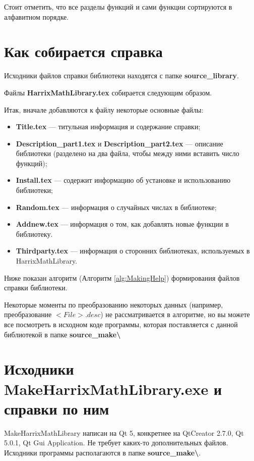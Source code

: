 \documentclass[a4paper,12pt]{article}
\begin{document}
Стоит отметить, что все разделы функций и сами функции сортируются в алфавитном порядке.


\section{Как собирается справка}
Исходники файлов справки библиотеки находятся с папке
\textbf{source\_library}.

Файлы \textbf{HarrixMathLibrary.tex} собирается следующим образом.

Итак, вначале добавляются к файлу некоторые основные файлы:

\begin{itemize}
\item \textbf{Title.tex} --- титульная информация и содержание справки;
\item \textbf{Description\_part1.tex} и \textbf{Description\_part2.tex} --- описание библиотеки (разделено на два файла, чтобы между ними вставить число функций);
\item \textbf{Install.tex} --- содержит информацию об установке и использованию библиотеки;
\item \textbf{Random.tex} --- информация о случайных числах в библиотеке;
\item \textbf{Addnew.tex} --- информация о том, как добавлять новые функции в библиотеку.
\item \textbf{Thirdparty.tex} --- информация о сторонних библиотеках, используемых в HarrixMathLibrary.
\end{itemize}

Ниже показан алгоритм (Алгоритм \ref{alg:MakingHelp}) формирования файлов справки библиотеки.

Некоторые моменты по преобразованию некоторых данных (например, преобразование $<File>.desc$) не рассматривается в алгоритме, но вы можете все посмотреть в исходном коде программы, которая поставляется с данной библиотекой в папке \textbf{source\_make\textbackslash}

\section{Исходники MakeHarrixMathLibrary.exe и справки по ним}

MakeHarrixMathLibrary написан на Qt 5, конкретнее на QtCreator 2.7.0, Qt 5.0.1, Qt Gui Application.  Не требует каких-то дополнительных файлов. Исходники программы располагаются в папке \textbf{source\_make\textbackslash}.
\end{document}
